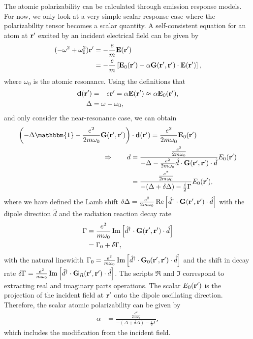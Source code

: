 The atomic polarizability can be calculated through emission response models. For now, we only look at a very simple scalar response case where the polarizability tensor becomes a scalar quantity. A self-consistent equation for an atom at $ \mathbf{r}' $ excited by an incident electrical field can be given by 
\begin{align}
(-\omega^2+\omega_0^2)\mathbf{r}' &= -\frac{e}{m}\mathbf{E}(\mathbf{r}')\\
&=-\frac{e}{m}\left[\mathbf{E}_0(\mathbf{r}')+ {\alpha}\mathbf{G}(\mathbf{r}',\mathbf{r}')\cdot  \mathbf{E}(\mathbf{r}') \right],
\end{align}
where $\omega_0$ is the atomic resonance. Using the definitions that 
\begin{align}
\mathbf{d}(\mathbf{r}') &=-e\mathbf{r}'=\alpha \mathbf{E}(\mathbf{r}')\approx \alpha \mathbf{E}_0(\mathbf{r}'),\\
\Delta &=\omega-\omega_0,
\end{align}
and only consider the near-resonance case, we can obtain
\begin{align}
\left(-\Delta\mathbbm{1} -\frac{e^2}{2m\omega_0}\mathbf{G}(\br',\br') \right) &\cdot \mathbf{d}(\br') = \frac{e^2}{2m\omega_0}\mathbf{E}_0(\br')\\
\Rightarrow\qquad d &=\frac{\frac{e^2}{2m\omega_0}}{-\Delta-\frac{ e^2}{2m\omega_0}\hat{d}\cdot\mathbf{G}(\br',\br')\cdot \hat{d}}E_0(\br')\\
&=\frac{\frac{e^2}{2m\omega_0}}{-(\Delta+\delta \Delta)-\frac{i}{2}\Gamma}E_0(\br'),
\end{align}
where we have defined the Lamb shift $ \delta \Delta= \frac{e^2}{2m\omega_0}\operatorname{Re}\left[\hat{d}^\dagger\cdot\mathbf{G}(\mathbf{r}',\mathbf{r}')\cdot \hat{d} \right]$ with the dipole direction $ \hat{d} $ and the radiation reaction decay rate 
\begin{align}
\Gamma &= \frac{e^2}{m\omega_0}\operatorname{Im}\left[\hat{d}^\dagger\cdot\mathbf{G}(\mathbf{r}',\mathbf{r}')\cdot \hat{d}\right]\\
&= \Gamma_0 + \delta \Gamma,
\end{align}
with the natural linewidth $ \Gamma_0=\frac{e^2}{m\omega_0}\operatorname{Im}\left[\hat{d}^\dagger\cdot\mathbf{G}_0(\mathbf{r}',\mathbf{r}')\cdot \hat{d}\right] $ and the shift in decay rate $ \delta\Gamma=\frac{e^2}{m\omega_0}\operatorname{Im}\left[\hat{d}^\dagger\cdot\mathbf{G}_R(\mathbf{r}',\mathbf{r}')\cdot \hat{d}\right] $. The scripts $ \Re $ and $ \Im $ correspond to extracting real and imaginary parts operations. The scalar $ E_0(\mathbf{r}') $ is the projection of the incident field at $ \mathbf{r}' $ onto the dipole oscillating direction. Therefore, the scalar atomic polarizability can be given by
\begin{align}
\alpha &= \frac{\frac{e^2}{2m\omega_0}}{-(\Delta+\delta \Delta)-\frac{i}{2}\Gamma},
\end{align}
which includes the modification from the incident field. 

